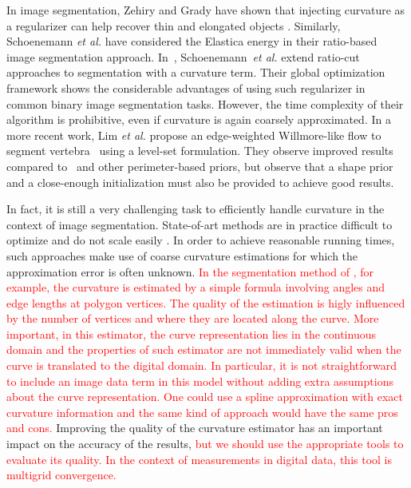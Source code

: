 \documentclass[smallextended]{svjour3}       %
\newcommand{\revision}[1]{\textcolor{red}{#1}}
\begin{document}
In image segmentation, Zehiry and Grady have shown that injecting
curvature as a regularizer can help recover thin and elongated objects
\cite{zehiry10fast}. Similarly, Schoenemann {\em et al.}
\cite{schoenemann09linear} have considered the Elastica energy in
their ratio-based image segmentation
approach. In~\cite{schoenemann2011elastic}, Schoenemann~{\em et al.}
extend ratio-cut approaches to segmentation with a curvature
term. Their global optimization framework shows the considerable
advantages of using such regularizer in common binary image
segmentation tasks.  However, the time complexity of their algorithm
is prohibitive, even if curvature is again coarsely
approximated.  In a more recent work, Lim {\em et al.} propose an
edge-weighted Willmore-like flow to segment
vertebra~\cite{lim2012introducing} using a level-set
formulation. They observe improved results compared
to~\cite{caseles97geodesic} and other perimeter-based priors, but
observe that a shape prior and a close-enough initialization must also be
provided to achieve good results.

In fact, it is still a very challenging task to efficiently handle
curvature in the context of image segmentation.  State-of-art methods
are in practice difficult to optimize and do not scale easily
\cite{zehiry10fast,schoenemann09linear,strandmark11globalframework,nieuwenhuis14efficient}. In
order to achieve reasonable running times, such approaches make use of
coarse curvature estimations for which the approximation error is
often unknown. \revision{In the segmentation method of \cite{schoenemann09linear}, for example, the curvature is estimated by a simple formula involving angles and edge lengths at polygon vertices. The quality of the estimation is higly influenced by the number of vertices and where they are located along the curve. More important, in this estimator, the curve representation lies in the continuous domain and the properties of such estimator are not immediately valid when the curve is translated to the digital domain.  In particular, it is not straightforward to include an image data term in this model without adding extra assumptions about the curve representation. One could use a spline approximation with exact curvature information and the same kind of approach would have the same pros and cons.} Improving the quality of the curvature estimator has an important impact on the accuracy of the results, \revision{but we should use the appropriate tools to evaluate its quality. In the context of measurements in digital data, this tool is multigrid convergence.}
\end{document}
